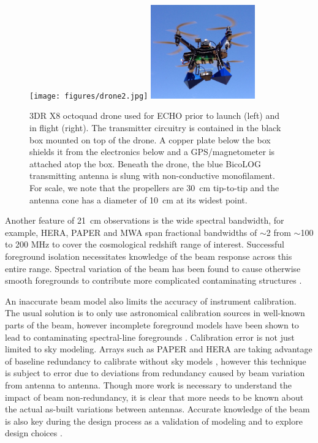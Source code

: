 \documentclass[preprint2,numberedappendix,tighten,twocolappendix]{aastex6}
\begin{document}
\begin{figure}[hbt]
\centering
\texttt{[image: figures/drone2.jpg]}
\includegraphics[width=0.4\textwidth]{figures/drone.png}
\caption{3DR X8 octoquad drone used for ECHO prior to launch (left) and in flight (right).  The transmitter circuitry is contained in the black box mounted on top of the drone.  A copper plate below the box shields it from the electronics below and a GPS/magnetometer is attached atop the box. Beneath the drone, the blue BicoLOG transmitting antenna is slung with non-conductive monofilament. For scale, we note that the propellers are 30~cm tip-to-tip and the antenna cone has a diameter of 10~cm at its widest point.}
\label{fig:drone}
\end{figure}

Another feature of 21~cm observations is the wide spectral bandwidth, for example, HERA, PAPER and MWA span fractional bandwidths of $\sim$2 from $\sim$100 to 200 MHz to cover the cosmological redshift range of interest. Successful foreground isolation necessitates knowledge of the beam response across this entire range.  Spectral variation of the beam has been found to cause otherwise smooth foregrounds to contribute more complicated contaminating structures \citep{2016:ThyagarajanBeamChromaticity,2016:EwallWiceHERAdisharXiv}. 

An inaccurate beam model also limits the accuracy of instrument calibration. The usual solution is to only use astronomical calibration sources in well-known parts of the beam, however incomplete foreground models have been shown to lead to contaminating spectral-line foregrounds \citep{2016:BarryCalibrationRequirements}.  Calibration error is not just limited to sky modeling.  Arrays such as PAPER and HERA are taking advantage of baseline redundancy to calibrate without sky models \citep{Liu:2010p10391,Zheng:2014p10467,2015ApJ...809...61A}, however this technique is subject to error due to deviations from redundancy caused by beam variation from antenna to antenna. Though more work is necessary to understand the impact of beam non-redundancy, it is clear that more needs to be known about the actual as-built variations between antennas.  Accurate knowledge of the beam is also key during the design process as a validation of modeling and to explore design choices \citep{2014IAWPL..13..169V,2016:NebenHERAdish}. 
\end{document}
